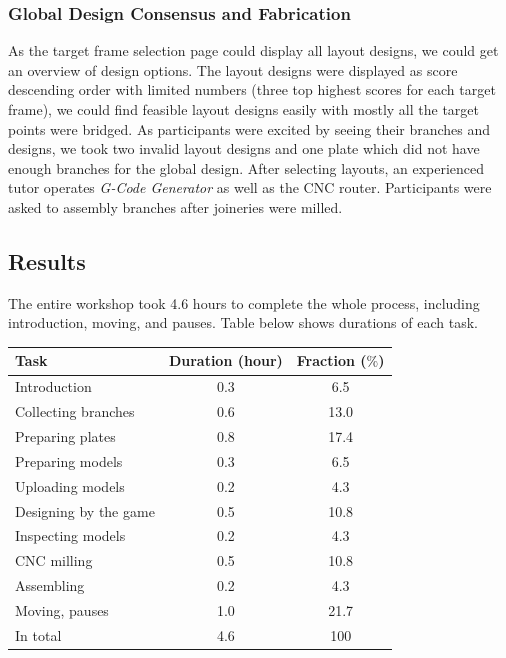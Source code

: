 \subsubsection*{Global Design Consensus and Fabrication} 
As the target frame selection page could display all layout designs, we could get an overview of design options.
The layout designs were displayed as score descending order with limited numbers (three top highest scores for each target frame), we could find feasible layout designs easily with mostly all the target points were bridged.
As participants were excited by seeing their branches and designs, we took two invalid layout designs and one plate which did not have enough branches for the global design.
%
After selecting layouts, an experienced tutor operates \textit{G-Code Generator} as well as the CNC router.
Participants were asked to assembly branches after joineries were milled.

\subsection{Results}


The entire workshop took 4.6 hours to complete the whole process, including introduction, moving, and pauses.
Table below shows durations of each task.

\begin{center}
  \begin{tabulary}{\columnwidth}{ |l||C|C| }
    \hline
    Task & Duration (hour) & Fraction ($\%$) \\
    \hline
    Introduction                  & 0.3 & 6.5  \\
    Collecting branches           & 0.6 & 13.0  \\
    Preparing plates              & 0.8 & 17.4  \\
    Preparing models              & 0.3 & 6.5  \\
    Uploading models              & 0.2 & 4.3 \\
    Designing by the game         & 0.5 & 10.8 \\
    Inspecting models             & 0.2 & 4.3 \\
    CNC milling                   & 0.5 & 10.8\\
    Assembling                    & 0.2 & 4.3 \\
    Moving, pauses               & 1.0 & 21.7 \\
    \hline
    In total                      & 4.6   & 100 \\
    \hline
  \end{tabulary}
  \label{tab:timing}
\end{center}



